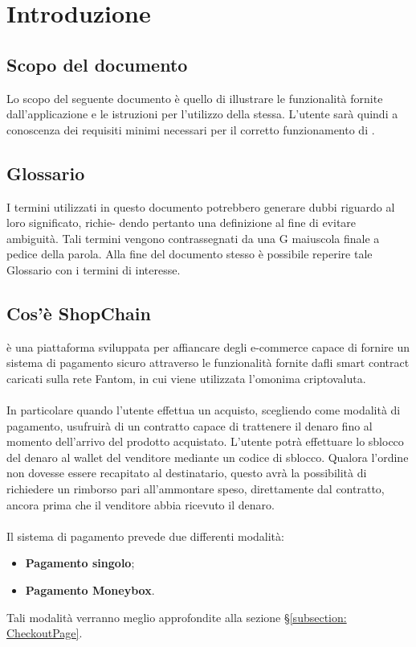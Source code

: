 \section{Introduzione}\label{section:introduzione}

\subsection{Scopo del documento}
Lo scopo del seguente documento è quello di illustrare le funzionalità fornite dall'applicazione e le istruzioni per l'utilizzo della stessa.
L'utente sarà quindi a conoscenza dei requisiti minimi necessari per il corretto funzionamento di \projectName.

\subsection{Glossario}
I termini utilizzati in questo documento potrebbero generare dubbi riguardo al loro significato, richie-
dendo pertanto una definizione al fine di evitare ambiguità. Tali termini vengono contrassegnati da
una G maiuscola finale a pedice della parola. Alla fine del documento stesso è possibile reperire tale Glossario con i termini di interesse.

\subsection{Cos'è ShopChain}
\projectName{} è una piattaforma sviluppata per affiancare degli e-commerce\glo{} capace di fornire un sistema di pagamento sicuro attraverso le funzionalità fornite dafli smart contract\glo{} caricati sulla rete Fantom\glo{}, in cui viene utilizzata l'omonima criptovaluta\glo{}.\\\\
In particolare quando l'utente effettua un acquisto, scegliendo \projectName{} come modalità di pagamento, usufruirà di un contratto capace di trattenere il denaro fino al momento dell'arrivo del prodotto acquistato. L'utente potrà effettuare lo sblocco del denaro al wallet\glo{} del venditore mediante un codice di sblocco. Qualora l'ordine non dovesse essere recapitato al destinatario, questo avrà la possibilità di richiedere un rimborso pari all'ammontare speso, direttamente dal contratto, ancora prima che il venditore abbia ricevuto il denaro.\\\\
Il sistema di pagamento prevede due differenti modalità:
\begin{itemize}
    \item \textbf{Pagamento singolo};
    \item  \textbf{Pagamento Moneybox}.
\end{itemize}
Tali modalità verranno meglio approfondite alla sezione §\ref{subsection: CheckoutPage}.

